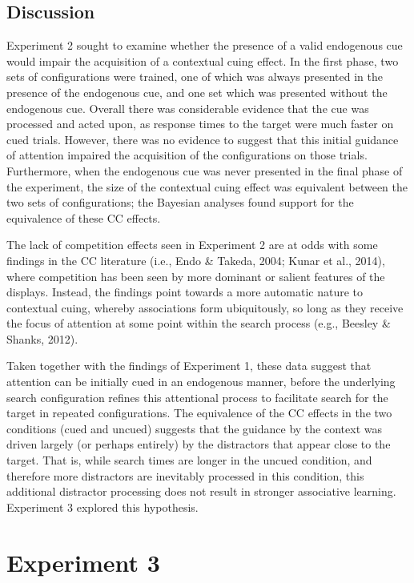 \documentclass[
  man,floatsintext]{apa7}
\begin{document}
\hypertarget{discussion-1}{%
\subsection{Discussion}\label{discussion-1}}

Experiment 2 sought to examine whether the presence of a valid endogenous cue would impair the acquisition of a contextual cuing effect. In the first phase, two sets of configurations were trained, one of which was always presented in the presence of the endogenous cue, and one set which was presented without the endogenous cue. Overall there was considerable evidence that the cue was processed and acted upon, as response times to the target were much faster on cued trials. However, there was no evidence to suggest that this initial guidance of attention impaired the acquisition of the configurations on those trials. Furthermore, when the endogenous cue was never presented in the final phase of the experiment, the size of the contextual cuing effect was equivalent between the two sets of configurations; the Bayesian analyses found support for the equivalence of these CC effects.

The lack of competition effects seen in Experiment 2 are at odds with some findings in the CC literature (i.e., Endo \& Takeda, 2004; Kunar et al., 2014), where competition has been seen by more dominant or salient features of the displays. Instead, the findings point towards a more automatic nature to contextual cuing, whereby associations form ubiquitously, so long as they receive the focus of attention at some point within the search process (e.g., Beesley \& Shanks, 2012).

Taken together with the findings of Experiment 1, these data suggest that attention can be initially cued in an endogenous manner, before the underlying search configuration refines this attentional process to facilitate search for the target in repeated configurations. The equivalence of the CC effects in the two conditions (cued and uncued) suggests that the guidance by the context was driven largely (or perhaps entirely) by the distractors that appear close to the target. That is, while search times are longer in the uncued condition, and therefore more distractors are inevitably processed in this condition, this additional distractor processing does not result in stronger associative learning. Experiment 3 explored this hypothesis.

\hypertarget{experiment-3}{%
\section{Experiment 3}\label{experiment-3}}
\end{document}
